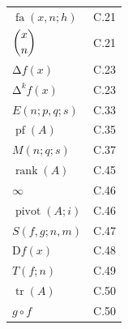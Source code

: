 \documentclass[../libro.tex]{subfiles}
\begin{document}
\begin{longtable}[c]{ll}
    \(\operatorname{fa} {(x, n; h)}\)
    & C.21
    \\

    \(\dbinom{x}{n}\)
    & C.21
    \\

    \(\increment f(x)\)
    & C.23
    \\

    \(\increment^k f(x)\)
    & C.23
    \\

    \(E(n; p, q; s)\)
    & C.33
    \\

    \(\operatorname{pf} {(A)}\)
    & C.35
    \\

    \(M(n; q; s)\)
    & C.37
    \\

    \(\operatorname{rank} {(A)}\)
    & C.45
    \\

    \(\infty\)
    & C.46
    \\

    \(\operatorname{pivot} {(A; i)}\)
    & C.46
    \\

    \(S(f, g; n, m)\)
    & C.47
    \\

    \(\mathrm{D} f(x)\)
    & C.48
    \\

    \(T(f; n)\)
    & C.49
    \\

    \(\operatorname{tr} {(A)}\)
    & C.50
    \\

    \(g \circ f\)
    & C.50
    \\
\end{longtable}
\end{document}
